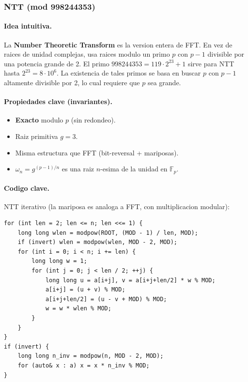 ﻿\subsubsection{NTT (mod 998244353)}

\paragraph{Idea intuitiva.}
La \textbf{Number Theoretic Transform} es la version entera de FFT. En vez de raices de unidad complejas, usa raices modulo un primo $p$ con $p - 1$ divisible por una potencia grande de 2. El primo $998244353 = 119 \cdot 2^{23} + 1$ sirve para NTT hasta $2^{23} = 8 \cdot 10^6$. La existencia de tales primos se basa en buscar $p$ con $p - 1$ altamente divisible por 2, lo cual requiere que $p$ sea grande.

\paragraph{Propiedades clave (invariantes).}
\begin{itemize}\setlength\itemsep{0pt}
	\item \textbf{Exacto} modulo $p$ (sin redondeo).
	\item Raiz primitiva $g = 3$.
	\item Misma estructura que FFT (bit-reversal + mariposas).
	\item $\omega_n = g^{(p-1)/n}$ es una raiz $n$-esima de la unidad en $\mathbb{F}_p$.
\end{itemize}

\paragraph{Codigo clave.}
NTT iterativo (la mariposa es analoga a FFT, con multiplicacion modular):
\begin{verbatim}
for (int len = 2; len <= n; len <<= 1) {
    long long wlen = modpow(ROOT, (MOD - 1) / len, MOD);
    if (invert) wlen = modpow(wlen, MOD - 2, MOD);
    for (int i = 0; i < n; i += len) {
        long long w = 1;
        for (int j = 0; j < len / 2; ++j) {
            long long u = a[i+j], v = a[i+j+len/2] * w % MOD;
            a[i+j] = (u + v) % MOD;
            a[i+j+len/2] = (u - v + MOD) % MOD;
            w = w * wlen % MOD;
        }
    }
}
if (invert) {
    long long n_inv = modpow(n, MOD - 2, MOD);
    for (auto& x : a) x = x * n_inv % MOD;
}
\end{verbatim}

